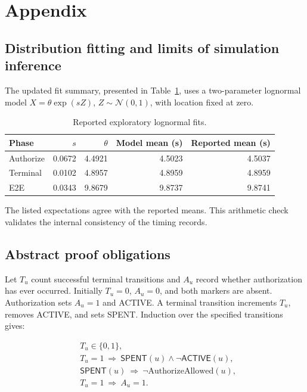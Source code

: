 \documentclass[fleqn,10pt,lineno]{wlpeerj}
\newcommand{\Active}{\mathsf{ACTIVE}}
\newcommand{\Spent}{\mathsf{SPENT}}
\begin{document}
\section*{Appendix}
\subsection*{Distribution fitting and limits of simulation inference}

The updated fit summary, presented in Table~\ref{tab:fits}, uses a two-parameter lognormal model $X=\theta\exp(sZ)$, $Z\sim\mathcal N(0,1)$, with location fixed at zero.

\begin{table}[htbp]
\centering
\small
\caption{Reported exploratory lognormal fits.}
\label{tab:fits}
\begin{tabular}{lrrrr}
\toprule
Phase & $s$ & $\theta$ & Model mean (s) & Reported mean (s)\\
\midrule
Authorize & 0.0672 & 4.4921 & 4.5023 & 4.5037\\
Terminal & 0.0102 & 4.8957 & 4.8959 & 4.8959\\
E2E & 0.0343 & 9.8679 & 9.8737 & 9.8741\\
\bottomrule
\end{tabular}
\end{table}

The listed expectations agree with the reported means. This arithmetic check validates the internal consistency of the timing records.

\subsection*{Abstract proof obligations}

Let $T_u$ count successful terminal transitions and $A_u$ record whether authorization has ever occurred. Initially $T_u=0$, $A_u=0$, and both markers are absent. Authorization sets $A_u=1$ and ACTIVE. A terminal transition increments $T_u$, removes ACTIVE, and sets SPENT. Induction over the specified transitions gives:

\begin{align}
&T_u\in\{0,1\},\\
&T_u=1\ \Longrightarrow\ \Spent(u)\land\neg\Active(u),\\
&\Spent(u)\ \Longrightarrow\ \neg\mathrm{AuthorizeAllowed}(u),\\
&T_u=1\ \Longrightarrow\ A_u=1.
\end{align}
\end{document}
